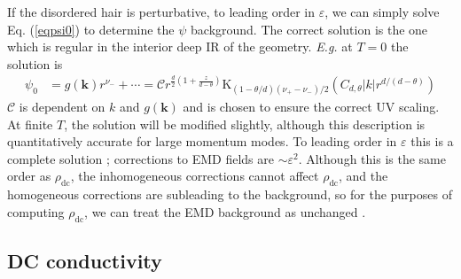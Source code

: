 \documentclass[10pt, oneside]{book}
\begin{document}
\begin{doublespace}
If the disordered hair is perturbative, to leading order in $\varepsilon$, we can simply solve Eq. (\ref{eqpsi0}) to determine the $\psi$ background. The correct solution is the one which is regular in the interior deep IR of the geometry.
{\em E.g.\/} at $T=0$ the solution is
\begin{align}
\label{eq:5}
\psi_0 &= g(\mathbf{k}) r^{\nu_-} + \cdots = \mathcal{C}r^{\frac{d}{2}(1+\frac{z}{d-\theta})} \mathrm{K}_{(1-\theta/d)(\nu_+-\nu_-)/2}\left(C_{d,\theta} |k| r^{d/(d-\theta)}\right)
\end{align}
$\mathcal{C}$ is dependent on $k$ and $g(\mathbf{k})$ and is chosen to ensure the correct UV scaling.   At finite $T$, the solution will be modified slightly, although this description is quantitatively accurate for large momentum modes.  To leading order in $\varepsilon$ this is a complete solution \cite{Blake:2013owa}; corrections to EMD fields are $\sim\varepsilon^2$.   Although this is the same order as $\rho_{\mathrm{dc}}$, the inhomogeneous corrections cannot affect $\rho_{\mathrm{dc}}$, and the homogeneous corrections are subleading to the background, so for the purposes of computing $\rho_{\mathrm{dc}}$, we can treat the EMD background as unchanged \cite{Blake:2013owa}.   

\subsection{DC conductivity}


\end{doublespace}
\end{document}
